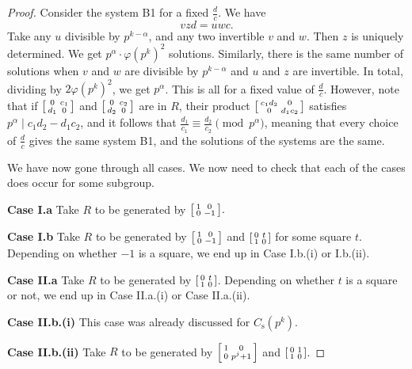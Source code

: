 \documentclass[10pt,leqno]{amsart}
\newcommand\sm[1]{\begin{bsmallmatrix}#1\end{bsmallmatrix}}
\theoremstyle{definition}
\theoremstyle{remark}
\numberwithin{theorem}{section}
\begin{document}
\begin{proof}
Consider the system B1 for a fixed $\frac{d}{c}$. We have $$vzd=uwc.$$ Take any $u$ divisible by $p^{k-\alpha}$, and any two invertible $v$ and $w$. Then $z$ is uniquely determined. We get $p^\alpha\cdot \varphi(p^k)^2$ solutions. Similarly, there is the same number of solutions when $v$ and $w$ are divisible by $p^{k-\alpha}$ and $u$ and $z$ are invertible. In total, dividing by $2\varphi(p^k)^2$, we get $p^\alpha$. This is all for a fixed value of $\frac{d}{c}$. However, note that if $\sm{0 & c_1 \\ d_1 & 0}$ and $\sm{0 & c_2 \\ d_2 & 0}$ are in $R$, their product $\sm{c_1d_2 & 0 \\0 & d_1c_2}$ satisfies $p^\alpha \mid c_1d_2-d_1c_2$, and it follows that $\frac{d_1}{c_1}\equiv \frac{d_2}{c_2} \pmod{p^\alpha}$, meaning that every choice of $\frac{d}{c}$ gives the same system B1, and the solutions of the systems are the same.

We have now gone through all cases. We now need to check that each of the cases does occur for some subgroup.

\noindent \textbf{Case I.a} Take $R$ to be generated by $\sm{1 & 0 \\ 0 & -1}.$

\noindent \textbf{Case I.b} Take $R$ to be generated by $\sm{1 & 0 \\ 0 & -1}$ and $\sm{0 & t \\ 1 & 0}$ for some square $t$. Depending on whether $-1$ is a square, we end up in Case I.b.(i) or I.b.(ii).

\noindent \textbf{Case II.a} Take $R$ to be generated by $\sm{0 & t \\ 1 & 0}$. Depending on whether $t$ is a square or not, we end up in Case II.a.(i) or Case II.a.(ii).

\noindent \textbf{Case II.b.(i)} This case was already discussed for $C_{\mathrm s}(p^k)$.

\noindent \textbf{Case II.b.(ii)} Take $R$ to be generated by $\sm{1  & 0 \\ 0 & p^j+1}$ and $\sm{0 & 1 \\ 1 & 0}$.
\end{proof}
\end{document}
